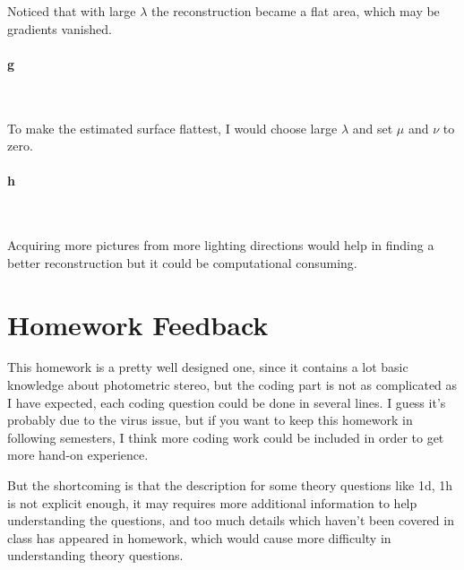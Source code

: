 \documentclass[11pt]{article} \usepackage{fullpage} \usepackage{graphicx} \usepackage{epstopdf} \usepackage{color} \usepackage{psfrag} \usepackage{pdfsync}\usepackage{indentfirst}\usepackage{subfigure}\usepackage{float}\usepackage[section]{placeins}
\begin{document}
Noticed that with large $\lambda$ the reconstruction became a flat area, which may be gradients vanished.

\paragraph{g}~{}

To make the estimated surface flattest, I would choose large $\lambda$ and set $\mu$ and $\nu$ to zero.

\paragraph{h}~{}

Acquiring more pictures from more lighting directions would help in finding a better reconstruction but it could be computational consuming.

\section{Homework Feedback}

This homework is a pretty well designed one, since it contains a lot basic knowledge about photometric stereo, but the coding part is not as complicated as I have expected, each coding question could be done in several lines. I guess it's probably due to the virus issue, but if you want to keep this homework in following semesters, I think more coding work could be included in order to get more hand-on experience.

But the shortcoming is that the description for some theory questions like 1d, 1h is not explicit enough, it may requires more additional information to help understanding the questions, and too much details which haven't been covered in class has appeared in homework, which would cause more difficulty in understanding theory questions.
\end{document}

